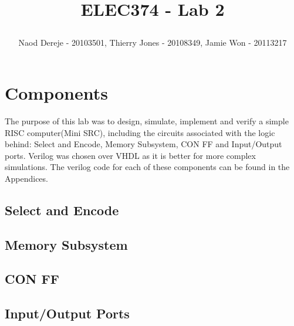 \documentclass{article}
\title{
    \begin{large}
        ELEC374 - Lab 2
    \end{large}
}
\author{Naod Dereje - 20103501, Thierry Jones - 20108349, Jamie Won - 20113217}
\begin{document}
\maketitle
\cleardoublepage
\tableofcontents
\cleardoublepage


\section{Components}
    The purpose of this lab was to design, simulate, implement and verify a simple RISC computer(Mini SRC), including the circuits associated with the logic behind: 
    Select and Encode, Memory Subsystem, CON FF and Input/Output ports. Verilog was chosen over VHDL as it is better for more complex simulations. The verilog code 
    for each of these components can be found in the Appendices.
    
    \subsection{Select and Encode}


    \subsection{Memory Subsystem}
    

    \subsection{CON FF}
    

    \subsection{Input/Output Ports}
\end{document}
